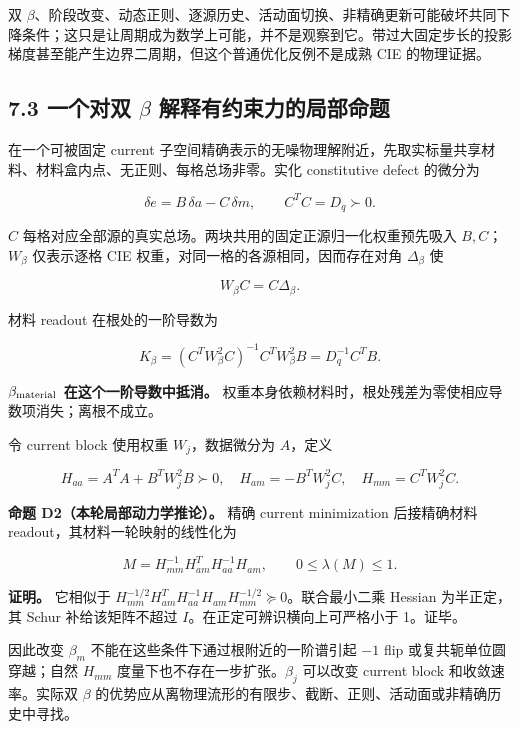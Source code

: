 \documentclass[11pt,a4paper]{article}
\begin{document}
双
\(\beta\)、阶段改变、动态正则、逐源历史、活动面切换、非精确更新可能破坏共同下降条件；这只是让周期成为数学上可能，并不是观察到它。带过大固定步长的投影梯度甚至能产生边界二周期，但这个普通优化反例不是成熟
CIE 的物理证据。

\hypertarget{ux4e00ux4e2aux5bf9ux53cc-beta-ux89e3ux91caux6709ux7ea6ux675fux529bux7684ux5c40ux90e8ux547dux9898}{%
\subsection{\texorpdfstring{7.3 一个对双 \(\beta\)
解释有约束力的局部命题}{7.3 一个对双 \textbackslash beta 解释有约束力的局部命题}}\label{ux4e00ux4e2aux5bf9ux53cc-beta-ux89e3ux91caux6709ux7ea6ux675fux529bux7684ux5c40ux90e8ux547dux9898}}

在一个可被固定 current
子空间精确表示的无噪物理解附近，先取实标量共享材料、材料盒内点、无正则、每格总场非零。实化
constitutive defect 的微分为

\[
\delta e=B\,\delta a-C\,\delta m,\qquad C^TC=D_q\succ0.
\]

\(C\) 每格对应全部源的真实总场。两块共用的固定正源归一化权重预先吸入
\(B,C\)；\(W_\beta\) 仅表示逐格 CIE
权重，对同一格的各源相同，因而存在对角 \(\Delta_\beta\) 使

\[
W_\beta C=C\Delta_\beta.
\]

材料 readout 在根处的一阶导数为

\[
K_\beta=(C^TW_\beta^2C)^{-1}C^TW_\beta^2B
=D_q^{-1}C^TB.
\]

\textbf{\(\beta_{\rm material}\) 在这个一阶导数中抵消。}
权重本身依赖材料时，根处残差为零使相应导数项消失；离根不成立。

令 current block 使用权重 \(W_j\)，数据微分为 \(A\)，定义

\[
H_{aa}=A^TA+B^TW_j^2B\succ0,\quad
H_{am}=-B^TW_j^2C,\quad H_{mm}=C^TW_j^2C.
\]

\textbf{命题 D2（本轮局部动力学推论）。} 精确 current minimization
后接精确材料 readout，其材料一轮映射的线性化为

\[
M=H_{mm}^{-1}H_{am}^TH_{aa}^{-1}H_{am},
\qquad 0\le\lambda(M)\le1.
\]

\textbf{证明。} 它相似于
\(H_{mm}^{-1/2}H_{am}^TH_{aa}^{-1}H_{am}H_{mm}^{-1/2}\succeq0\)。联合最小二乘
Hessian 为半正定，其 Schur 补给该矩阵不超过
\(I\)。在正定可辨识横向上可严格小于 1。证毕。

因此改变 \(\beta_m\) 不能在这些条件下通过根附近的一阶谱引起 \(-1\) flip
或复共轭单位圆穿越；自然 \(H_{mm}\) 度量下也不存在一步扩张。\(\beta_j\)
可以改变 current block 和收敛速率。实际双 \(\beta\)
的优势应从离物理流形的有限步、截断、正则、活动面或非精确历史中寻找。
\end{document}
